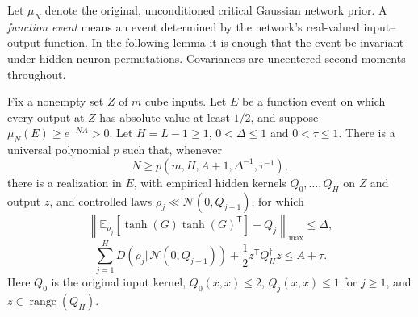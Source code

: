 Let $\mu_N$ denote the original, unconditioned critical Gaussian
network prior. A \emph{function event} means an event determined by
the network's real-valued input--output function. In the following
lemma it is enough that the event be invariant under hidden-neuron
permutations. Covariances are uncentered second moments throughout.

\begin{lemma}
\label{lem:critical-finite-witness-extraction}
Fix a nonempty set $Z$ of $m$ cube inputs. Let $E$ be a function event
on which every output at $Z$ has absolute value at least $1/2$, and
suppose $\mu_N(E)\ge e^{-NA}>0$. Let $H=L-1\ge1$,
$0<\Delta\le1$ and $0<\tau\le1$.
There is a universal polynomial $p$ such that, whenever
\[
 N\ge p(m,H,A+1,\Delta^{-1},\tau^{-1}),
\]
there is a realization in $E$, with empirical hidden kernels
$Q_0,\ldots,Q_H$ on $Z$ and output $z$, and controlled laws
$\rho_j\ll\mathcal N(0,Q_{j-1})$, for which
\[
 \left\|\mathbb E_{\rho_j}[\tanh(G)\tanh(G)^{\mathsf T}]-Q_j
                         \right\|_{\max}\le\Delta,
\]
\[
 \sum_{j=1}^H D(\rho_j\Vert\mathcal N(0,Q_{j-1}))
          +\frac12z^{\mathsf T}Q_H^\dagger z\le A+\tau.
\]
Here $Q_0$ is the original input kernel, $Q_0(x,x)\le2$,
$Q_j(x,x)\le1$ for $j\ge1$, and $z\in\operatorname{range}(Q_H)$.
\end{lemma}

